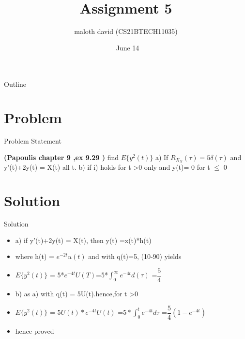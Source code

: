 \documentclass{beamer}
\title{Assignment 5}
\author{maloth david (CS21BTECH11035)}
\date{\ June 14}
\begin{document}
\begin{frame}
    \titlepage 
\end{frame}

\begin{frame}{Outline}
    \tableofcontents
\end{frame}


\section{Problem}
\begin{frame}{Problem Statement}

\textbf{(Papoulis chapter 9 ,ex 9.29 )} find $E\{y^2(t)\}$ a) If  $R_X_X(\tau) =5\delta(\tau)$ and y'(t)+2y(t) = X(t) all t. b) if i) holds for  t \textgreater 0 only and y(t)= 0 for  t $\leq$ 0

\end{frame}


\section{Solution}
\begin{frame}{Solution}

\begin{itemize}

\item a) if y'(t)+2y(t) = X(t), then y(t) =x(t)*h(t)
\item where h(t) = ${e^{-2t}}u(t)$ and with q(t)=5, (10-90) yields
\item $E\{y^2(t)\}$ = 5*${e^{-4t}}U(T)$=5*$\int_0^\infty{e^{-4t}}d(\tau)$ =$\dfrac{5}{4}$
\item b) as a) with q(t) = 5U(t).hence,for t \textgreater 0
 
\item $E\{y^2(t)\}$ = $5U(t)*{e^{-4t}U(t)}$ =$5*\int_0^t{e^{-4t}d\tau}$ =$ \dfrac{5}{4}(1-{e^{-4t}}) $
\item hence proved
\end{itemize}
    
    
\end{frame} 
\end{document}
